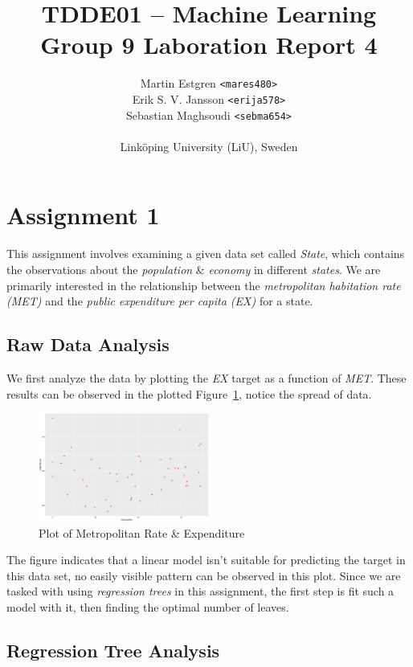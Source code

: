 \documentclass[a4paper, twocolumn]{article}
\title{TDDE01 -- Machine Learning \\
       Group 9 Laboration Report 4}
\author{{Martin Estgren \texttt{<mares480>}} \\
        {Erik S. V. Jansson \texttt{<erija578>}} \\
        {Sebastian Maghsoudi \texttt{<sebma654>}} \\~\\
        {Linköping University (LiU), Sweden}}
\begin{document}
    \maketitle %

    \section*{Assignment 1}

        This assignment involves examining a given data set called \emph{State}, which contains the observations about the \emph{population} \& \emph{economy} in different \emph{states}. We are primarily interested in the relationship between the \emph{metropolitan habitation rate (MET)} and the \emph{public expenditure per capita (EX)} for a state.

    \subsection*{Raw Data Analysis}

        We first analyze the data by plotting the \emph{EX} target as a function of \emph{MET}. These results can be observed in the plotted Figure~\ref{fig:state}, notice the spread of data.

        \begin{figure}[h!]
            \centering
            \caption{Plot of Metropolitan Rate \& Expenditure}
            \label{fig:state}
            \includegraphics[width=0.5\textwidth]{share/A1_data.eps}
        \end{figure}

        The figure indicates that a linear model isn't suitable for predicting the target in this data set, no easily visible pattern can be observed in this plot. Since we are tasked with using \emph{regression trees} in this assignment, the first step is fit such a model with it, then finding the optimal number of leaves.

    \subsection*{Regression Tree Analysis}
\end{document}
